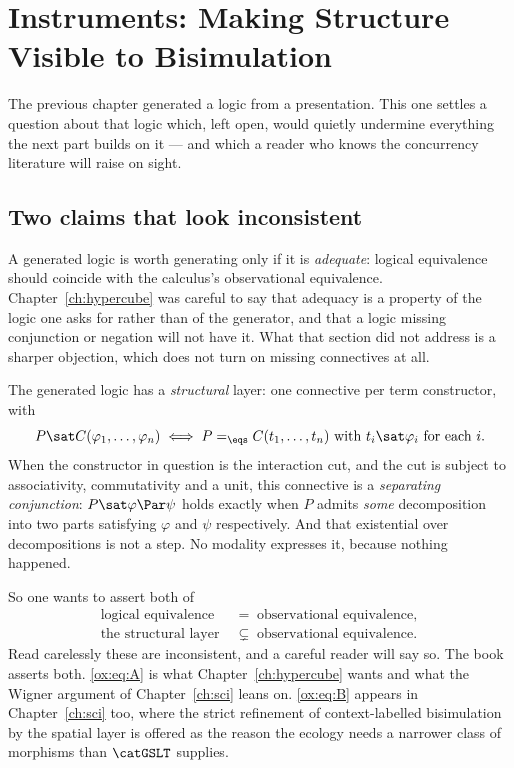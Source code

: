 \chapter{Instruments: Making Structure Visible to Bisimulation}
\label{ch:obsext}

The previous chapter generated a logic from a presentation. This one settles a
question about that logic which, left open, would quietly undermine everything the
next part builds on it --- and which a reader who knows the concurrency literature
will raise on sight.

\section{Two claims that look inconsistent}
\label{ox:sec:contradiction}

A generated logic is worth generating only if it is \emph{adequate}: logical
equivalence should coincide with the calculus's observational equivalence.
Chapter~\ref{ch:hypercube} was careful to say that adequacy is a property of the
logic one asks for rather than of the generator, and that a logic missing
conjunction or negation will not have it. What that section did not address is a
sharper objection, which does not turn on missing connectives at all.

The generated logic has a \emph{structural} layer: one connective per term
constructor, with
\[
  P \sat C(\varphi_1,\dots,\varphi_n)
  \iff
  P =_{\eqs} C(t_1,\dots,t_n) \text{ with } t_i \sat \varphi_i
  \text{ for each } i .
\]
When the constructor in question is the interaction cut, and the cut is subject to
associativity, commutativity and a unit, this connective is a \emph{separating
conjunction}: $P \sat \varphi \Par \psi$ holds exactly when $P$ admits
\emph{some} decomposition into two parts satisfying $\varphi$ and $\psi$
respectively. And that existential over decompositions is not a step. No modality
expresses it, because nothing happened.

So one wants to assert both of
\begin{align}
  \text{logical equivalence} \;&=\; \text{observational equivalence},
    \tag{A}\label{ox:eq:A}\\
  \text{the structural layer} \;&\subsetneq\; \text{observational equivalence}.
    \tag{B}\label{ox:eq:B}
\end{align}
Read carelessly these are inconsistent, and a careful reader will say so. The book
asserts both. \eqref{ox:eq:A} is what Chapter~\ref{ch:hypercube} wants and what the
Wigner argument of Chapter~\ref{ch:sci} leans on. \eqref{ox:eq:B} appears in
Chapter~\ref{ch:sci} too, where the strict refinement of context-labelled
bisimulation by the spatial layer is offered as the reason the ecology needs a
narrower class of morphisms than $\catGSLT$ supplies.

